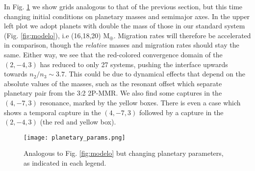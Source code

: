 \documentclass[baaa]{baaa}
\begin{document}
In Fig. \ref{fig:var_pl_params} we show grids analogous to that of the previous section, but this time changing initial conditions on planetary masses and semimajor axes.
In the upper left plot we adopt planets with double the mass of those in our standard system (Fig. \ref{fig:modelo}), i.e (16,18,20) $\mathrm{M_\oplus}$.
Migration rates will therefore be accelerated in comparison, though the \textit{relative} masses and migration rates should stay the same.
Either way, we see that the red-colored convergence domain of the $(2,-4,3)$ has reduced to only 27 systems, pushing the interface upwards towards $n_2/n_3\sim 3.7$.
This could be due to dynamical effects that depend on the absolute values of the masses, such as the resonant offset which separate planetary pair from the 3:2 2P-MMR.
We also find some captures in the $(4,-7,3)$ resonance, marked by the yellow boxes.
There is even a case which shows a temporal capture in the $(4,-7,3)$ followed by a capture in the $(2,-4,3)$ (the red and yellow box).




\begin{figure}[!t]
\centering
\texttt{[image: planetary\_params.png]}
\caption{Analogous to Fig. \ref{fig:modelo} but changing planetary parameters, as indicated in each legend.}
\label{fig:var_pl_params}
\end{figure}
\end{document}

